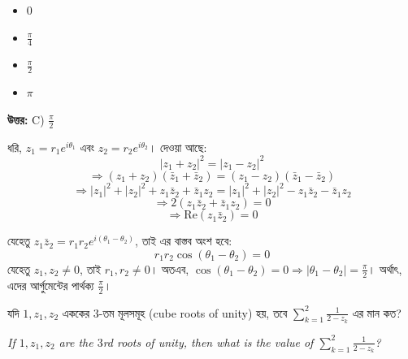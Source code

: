 \documentclass[12pt, a4paper]{article}
\begin{document}
\begin{itemize}[label={}, leftmargin=1cm, itemsep=0.5em]
    \item[\textbf{A)}] $0$
    \item[\textbf{B)}] $\frac{\pi}{4}$
    \item[\textbf{C)}] $\frac{\pi}{2}$
    \item[\textbf{D)}] $\pi$
\end{itemize}

\vspace{0.5em}
\begin{tcolorbox}[answerbox]
    \textbf{\color{success} উত্তর:} C) $\frac{\pi}{2}$
\end{tcolorbox}
\vspace{1em}

\begin{tcolorbox}[solutionbox={সমাধান (Solution)}]
    \noindent
    ধরি, $z_1 = r_1 e^{i\theta_1}$ এবং $z_2 = r_2 e^{i\theta_2}$। দেওয়া আছে:
    \[ |z_1 + z_2|^2 = |z_1 - z_2|^2 \]
    \[ \Rightarrow (z_1 + z_2)(\bar{z}_1 + \bar{z}_2) = (z_1 - z_2)(\bar{z}_1 - \bar{z}_2) \]
    \[ \Rightarrow |z_1|^2 + |z_2|^2 + z_1\bar{z}_2 + \bar{z}_1 z_2 = |z_1|^2 + |z_2|^2 - z_1\bar{z}_2 - \bar{z}_1 z_2 \]
    \[ \Rightarrow 2(z_1\bar{z}_2 + \bar{z}_1 z_2) = 0 \]
    \[ \Rightarrow \text{Re}(z_1\bar{z}_2) = 0 \]
    
    \vspace{0.5em}
    যেহেতু $z_1\bar{z}_2 = r_1 r_2 e^{i(\theta_1 - \theta_2)}$, তাই এর বাস্তব অংশ হবে:
    \[ r_1 r_2 \cos(\theta_1 - \theta_2) = 0 \]
    যেহেতু $z_1, z_2 \neq 0$, তাই $r_1, r_2 \neq 0$। অতএব, $\cos(\theta_1 - \theta_2) = 0 \Rightarrow |\theta_1 - \theta_2| = \frac{\pi}{2}$। অর্থাৎ, এদের আর্গুমেন্টের পার্থক্য $\frac{\pi}{2}$।
\end{tcolorbox}
\vspace{1em}

\begin{tcolorbox}[questionbox={প্রশ্ন (Question) 20}]
    \noindent
    যদি $1, z_1, z_2$ এককের $3$-তম মূলসমূহ (cube roots of unity) হয়, তবে $\sum_{k=1}^{2} \frac{1}{2 - z_k}$ এর মান কত?
    
    \vspace{0.8em}
    \begin{english}
    \noindent\textit{\color{darkgray}
    If $1, z_1, z_2$ are the $3$rd roots of unity, then what is the value of $\sum_{k=1}^{2} \frac{1}{2 - z_k}$?
    }
    \end{english}
\end{tcolorbox}
\end{document}

